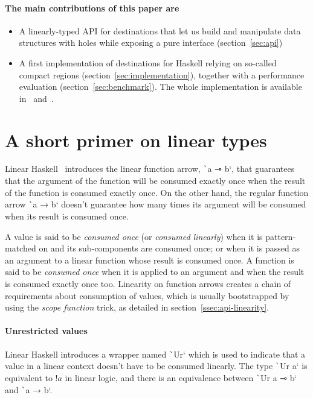 \documentclass[english]{jflart}
\begin{document}
\paragraph{The main contributions of this paper are}
\begin{itemize}
\item A linearly-typed API for destinations that let us build and manipulate data structures with holes while exposing a pure interface (section~\ref{sec:api})
\item A first implementation of destinations for Haskell relying on so-called compact regions (section~\ref{sec:implementation}), together with a performance evaluation (section~\ref{sec:benchmark}). The whole implementation is available in~\cite{custom_ghc} and~\cite{linear_dest}.
\end{itemize}

\section{A short primer on linear types}\label{ssec:intro-linearity}

Linear Haskell~\cite{bernardy_linear_2018} introduces the linear function arrow, \texttt`a ⊸ b`, that guarantees that the argument of the function will be consumed exactly once when the result of the function is consumed exactly once. On the other hand, the regular function arrow \texttt`a → b` doesn't guarantee how many times its argument will be consumed when its result is consumed once.

A value is said to be \emph{consumed once} (or \emph{consumed linearly}) when it is pattern-matched on and its sub-components are consumed once; or when it is passed as an argument to a linear function whose result is consumed once. A function is said to be \emph{consumed once} when it is applied to an argument and when the result is consumed exactly once too. Linearity on function arrows creates a chain of requirements about consumption of values, which is usually bootstrapped by using the \emph{scope function} trick, as detailed in section~\ref{ssec:api-linearity}.

\paragraph{Unrestricted values}

Linear Haskell introduces a wrapper named \texttt`Ur` which is used to indicate that a value in a linear context doesn't have to be consumed linearly. The type \texttt`Ur a` is equivalent to $!a$ in linear logic, and there is an equivalence between \texttt`Ur a ⊸ b` and \texttt`a → b`.
\end{document}
